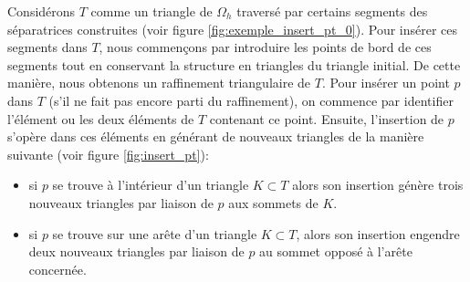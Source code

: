 Considérons $T$ comme un triangle de $\Omega_h$ traversé par certains segments des séparatrices construites (voir figure \ref{fig:exemple_insert_pt_0}). Pour insérer ces segments dans $T$, nous commençons par introduire les points de bord de ces segments tout en conservant la structure en triangles du triangle initial. De cette manière, nous obtenons un raffinement triangulaire de $T$. Pour insérer un point $p$ dans $T$ (s'il ne fait pas encore parti du raffinement), on commence par identifier l'élément ou les deux éléments de $T$ contenant ce point. Ensuite, l'insertion de $p$ s'opère dans ces éléments en générant de nouveaux triangles de la manière suivante (voir figure \ref{fig:insert_pt}):\\
\begin{itemize}
 \item si $p$ se trouve à l'intérieur d'un triangle $K\subset T$ alors son insertion génère trois nouveaux triangles par liaison de $p$ aux sommets de $K$.\\
 \item si $p$ se trouve sur une arête d'un triangle $K\subset T$, alors son insertion engendre deux nouveaux triangles par liaison de $p$ au sommet opposé à l'arête concernée.\\
\end{itemize}

